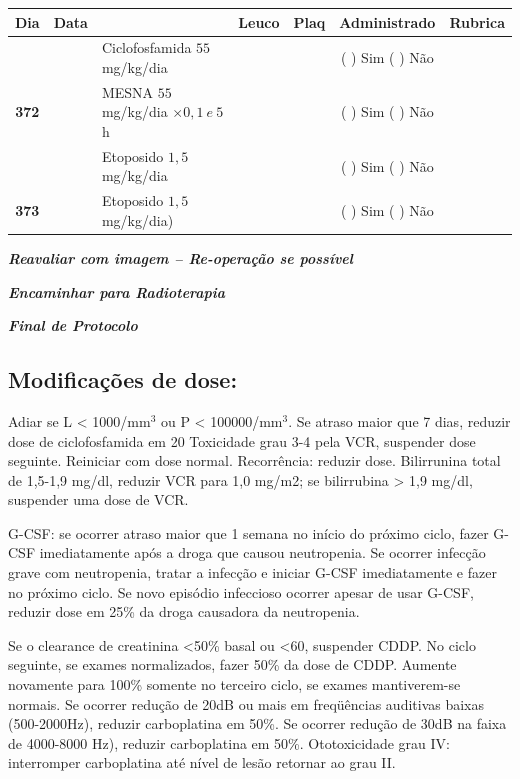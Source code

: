 \documentclass[11pt,a4paper,oldfontcommands]{memoir}
\begin{document}
\begin{center}
\begin{table}[H]
\begin{tabular}{p{1cm}c|p{4.8cm}|p{1.8cm}p{1.8cm}|c|c}
    \hline
\end{tabular}
\end{table}
\begin{table}[H] \small
\begin{tabular}{p{1cm}c|p{4.8cm}|p{1.8cm}p{1.8cm}|c|c}
	\hline
	\multicolumn{1}{c|}{\multirow{1}{*}{\textbf{Dia}}}&{Data}&{}&\multicolumn{1}{c|}{Leuco}&\multicolumn{1}{c|}{Plaq}&{Administrado}&{Rubrica} \\
    \hline
    \multicolumn{1}{c|}{\multirow{3}{*}{\textbf{372}}}&&{Ciclofosfamida \(55\) mg/kg/dia}&\multicolumn{1}{c|}{}&&{(  ) Sim (  ) Não}&\\
    \cline{4-5}
    \multicolumn{1}{c|}{}&&{MESNA \(55\) mg/kg/dia \(\times 0,1 \:e\: 5\)h}&&&{(  ) Sim (  ) Não}&\\
    \multicolumn{1}{c|}{}&&{Etoposido \(1,5\) mg/kg/dia}&&&{(  ) Sim (  ) Não}&\\
    \hline
    \multicolumn{1}{c|}{\multirow{1}{*}{\textbf{373}}}&&{Etoposido \(1,5\) mg/kg/dia)}&{}&&{(  ) Sim (  ) Não}&\\
    \hline
\end{tabular}
\end{table}
\textit{\textbf{Reavaliar com imagem – Re-operação se possível}}

\textit{\textbf{Encaminhar para Radioterapia}}

\textit{\textbf{Final de Protocolo}}
\end{center}
\subsection{Modificações de dose:}

Adiar se L < 1000/mm\(^3\) ou P < 100000/mm\(^3\). Se atraso maior que 7 dias, reduzir dose de ciclofosfamida em 20%
Toxicidade grau 3-4 pela VCR, suspender dose seguinte. Reiniciar com dose normal. Recorrência: reduzir dose.
Bilirrunina total de 1,5-1,9 mg/dl, reduzir VCR para 1,0 mg/m2; se bilirrubina > 1,9 mg/dl, suspender uma dose de VCR.

G-CSF: se ocorrer atraso maior que 1 semana no início do próximo ciclo, fazer G-CSF imediatamente após a droga que causou neutropenia. Se ocorrer infecção grave com neutropenia, tratar a infecção e iniciar G-CSF imediatamente e fazer no próximo ciclo. Se novo episódio infeccioso ocorrer apesar de usar G-CSF, reduzir dose em 25\% da droga causadora da neutropenia.

Se o clearance de creatinina <50\% basal ou <60, suspender CDDP. No ciclo seguinte, se exames normalizados, fazer 50\% da dose de CDDP. Aumente novamente para 100\% somente no terceiro ciclo, se exames mantiverem-se normais.
Se ocorrer redução de 20dB ou mais em freqüências auditivas baixas (500-2000Hz), reduzir carboplatina em 50\%. Se ocorrer redução de 30dB na faixa de 4000-8000 Hz), reduzir carboplatina em 50\%. Ototoxicidade grau IV: interromper carboplatina até nível de lesão retornar ao grau II.
\end{document}

